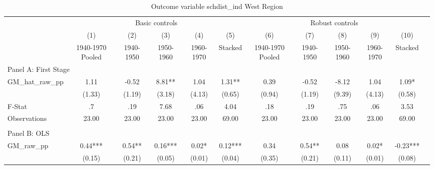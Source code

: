  \begin{table}[htbp]\centering {} \begin{threeparttable} \caption{Outcome variable schdist\_ind West Region} \begin{tabular}{l*{11}{c}} \toprule
          &\multicolumn{5}{c}{Basic controls}                                   &\multicolumn{5}{c}{Robust controls}                                  \\\cmidrule(lr){2-6}\cmidrule(lr){7-11}
          &\multicolumn{1}{c}{(1)}&\multicolumn{1}{c}{(2)}&\multicolumn{1}{c}{(3)}&\multicolumn{1}{c}{(4)}&\multicolumn{1}{c}{(5)}&\multicolumn{1}{c}{(6)}&\multicolumn{1}{c}{(7)}&\multicolumn{1}{c}{(8)}&\multicolumn{1}{c}{(9)}&\multicolumn{1}{c}{(10)}\\
          &\multicolumn{1}{c}{1940-1970 Pooled}&\multicolumn{1}{c}{1940-1950}&\multicolumn{1}{c}{1950-1960}&\multicolumn{1}{c}{1960-1970}&\multicolumn{1}{c}{Stacked}&\multicolumn{1}{c}{1940-1970 Pooled}&\multicolumn{1}{c}{1940-1950}&\multicolumn{1}{c}{1950-1960}&\multicolumn{1}{c}{1960-1970}&\multicolumn{1}{c}{Stacked}\\
\cmidrule(lr){1-11}
\multicolumn{10}{l}{Panel A: First Stage}\\
\cmidrule(lr){1-11}
GM\_hat\_raw\_pp&      1.11   &     -0.52   &      8.81** &      1.04   &      1.31** &      0.39   &     -0.52   &     -8.12   &      1.04   &      1.09*  \\
          &    (1.33)   &    (1.19)   &    (3.18)   &    (4.13)   &    (0.65)   &    (0.94)   &    (1.19)   &    (9.39)   &    (4.13)   &    (0.58)   \\
\midrule
F-Stat    &        .7   &       .19   &      7.68   &       .06   &      4.04   &       .18   &       .19   &       .75   &       .06   &      3.53   \\
Observations&     23.00   &     23.00   &     23.00   &     23.00   &     69.00   &     23.00   &     23.00   &     23.00   &     23.00   &     69.00   \\
\cmidrule[\heavyrulewidth](lr){1-11} \\ \cmidrule[\heavyrulewidth](lr){1-11}
\multicolumn{10}{l}{Panel B: OLS}\\
\cmidrule(lr){1-11}
GM\_raw\_pp &      0.44***&      0.54** &      0.16***&      0.02*  &      0.12***&      0.34   &      0.54** &      0.08   &      0.02*  &     -0.23***\\
          &    (0.15)   &    (0.21)   &    (0.05)   &    (0.01)   &    (0.04)   &    (0.35)   &    (0.21)   &    (0.11)   &    (0.01)   &    (0.08)   \\

\end{tabular}
\end{threeparttable}
\end{table}
